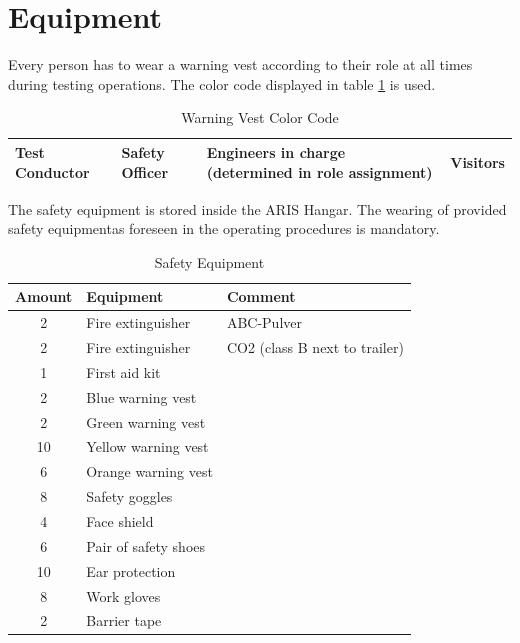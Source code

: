 \documentclass{article}
\begin{document}
\section{Equipment}
Every person has to wear a warning vest according to their role at all times during testing operations. The color code displayed in table \ref{tab:color-code} is used.
\begin{table}[h]
    \caption{Warning Vest Color Code}
    \label{tab:color-code}
    \begin{tabularx}{0.9\textwidth}{|X|X|X|X|}
        \hline
        \cellcolor{cyan} Test Conductor & \cellcolor{green} Safety Officer & \cellcolor{orange} Engineers in charge (determined in role assignment) & \cellcolor{yellow} Visitors \\ \hline
    \end{tabularx}
\end{table}
The safety equipment is stored inside the ARIS Hangar. The wearing of provided safety equipmentas foreseen in the operating procedures is mandatory.
\newpage
\begin{table}[h]
    \caption{Safety Equipment}
    \label{tab:safety-equipment}
    \begin{tabularx}{0.9\textwidth}{|c|X|X|}
        \hline
        \rowcolor{tableHeaderColor} \textbf{Amount} & \textbf{Equipment} & \textbf{Comment} \\ \hline
        2 & Fire extinguisher & ABC-Pulver \\ \hline
        2 & Fire extinguisher & CO2 (class B next to trailer) \\ \hline
        1 & First aid kit &  \\ \hline
        2 & Blue warning vest & \\ \hline
        2 & Green warning vest & \\ \hline
        10 & Yellow warning vest & \\ \hline
        6 & Orange warning vest & \\ \hline
        8 & Safety goggles & \\ \hline
        4 & Face shield & \\ \hline
        6 & Pair of safety shoes & \\ \hline
        10 & Ear protection & \\ \hline
        8 & Work gloves & \\ \hline
        2 & Barrier tape & \\ \hline
    \end{tabularx}
\end{table}
\end{document}
